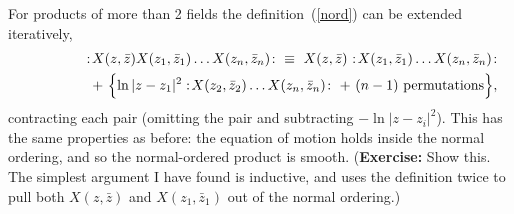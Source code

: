 For products of more than 2 fields the definition~(\ref{nord})
can be extended iteratively,
\begin{eqnarray}
&&{ :\! X(z,\bar z) X(z_1,\bar z_1)
\ldots X(z_n,\bar z_n) \! : }
\ \equiv\  X(z,\bar z) \,\,
{ :\! X(z_1,\bar z_1) \ldots X(z_n,\bar z_n) \! : } \label{enord}\\
&&\qquad\qquad
+\ \Bigl\{ \ln|z-z_1|^2  :\! X(z_2,\bar z_2)
\ldots X(z_n,\bar z_n) \! :\ +\ (n-1) {\rm\ permutations} \Bigr\},
\nonumber
\end{eqnarray}
contracting each pair (omitting the pair and subtracting $-\ln |z -
z_i|^2$).  This has the same properties as before: the equation of
motion holds inside the normal ordering, and so the normal-ordered
product is smooth.  ({\bf Exercise:} Show this.  The simplest argument
I have found is inductive, and uses the definition twice to pull
both $X(z,\bar z)$ and $X(z_1,\bar z_1)$ out of the normal ordering.)

